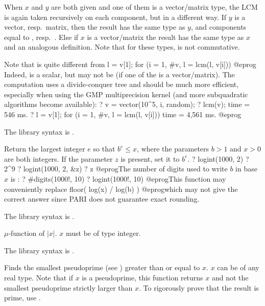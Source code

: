 When $x$ and $y$ are both given and one of them is a vector/matrix type,
the LCM is again taken recursively on each component, but in a different way.
If $y$ is a vector, resp.~matrix, then the result has the same type as $y$,
and components equal to , resp.~. Else
if $x$ is a vector/matrix the result has the same type as $x$ and an
analogous definition. Note that for these types,  is not
commutative.

Note that  is quite different from
\bprog
l = v[1]; for (i = 1, #v, l = lcm(l, v[i]))
@eprog\noindent
Indeed,  is a scalar, but  may not be (if one of
the  is a vector/matrix). The computation uses a divide-conquer tree
and should be much more efficient, especially when using the GMP
multiprecision kernel (and more subquadratic algorithms become available):
\bprog
? v = vector(10^5, i, random);
? lcm(v);
time = 546 ms.
? l = v[1]; for (i = 1, #v, l = lcm(l, v[i]))
time = 4,561 ms.
@eprog

The library syntax is .

\label{se:logint}
Return the largest integer $e$ so that $b^e \leq x$, where the
parameters $b > 1$ and $x > 0$ are both integers. If the parameter $z$ is
present, set it to $b^e$.
\bprog
? logint(1000, 2)
? 2^9
? logint(1000, 2, &z)
? z
@eprog\noindent The number of digits used to write $b$ in base $x$ is
:
\bprog
? #digits(1000!, 10)
? logint(1000!, 10)
@eprog\noindent This function may conveniently replace
\bprog
  floor( log(x) / log(b) )
@eprog\noindent which may not give the correct answer since PARI
does not guarantee exact rounding.

The library syntax is .

\label{se:moebius}
 $\mu$-function of $|x|$. $x$ must be of type integer.

The library syntax is .

\label{se:nextprime}
Finds the smallest pseudoprime (see
) greater than or equal to $x$. $x$ can be of any real
type. Note that if $x$ is a pseudoprime, this function returns $x$ and not
the smallest pseudoprime strictly larger than $x$. To rigorously prove that
the result is prime, use .

